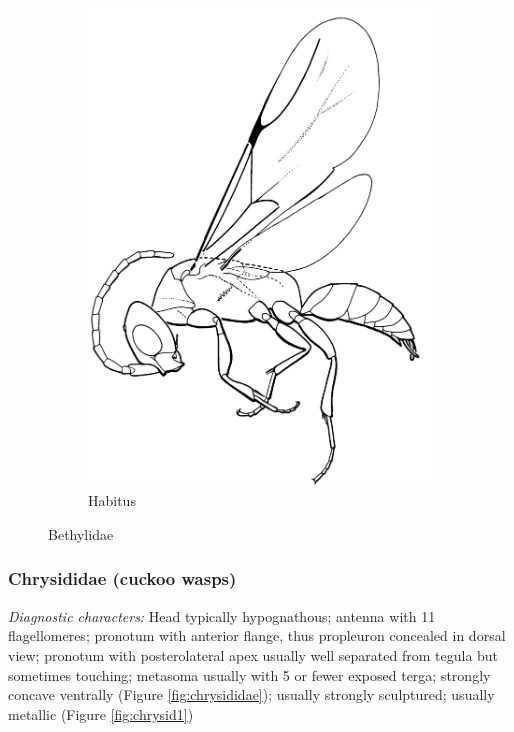 \documentclass[letterpaper, 11pt]{article}
\begin{document}
\begin{figure}[ht!]
\begin{subfigure}[ht!]{0.35\textwidth}
    \includegraphics[width=\textwidth]{BethylidHabitus}
  \caption{Habitus \citep[][Fig. 37]{goulet1993hymenoptera}}
  \label{fig:bethylid2}
\end{subfigure}
    \caption{Bethylidae}\label{fig:bethylids}
\end{figure}

\subsubsection{Chrysididae (cuckoo wasps)}
\noindent{}\textit{Diagnostic characters:} Head typically hypognathous; antenna with 11 flagellomeres; pronotum with anterior flange, thus propleuron concealed in dorsal view; pronotum with posterolateral apex usually well separated from tegula but sometimes touching; metasoma usually with 5 or fewer exposed terga; strongly concave ventrally (Figure \ref{fig:chrysididae}); usually strongly sculptured; usually metallic (Figure \ref{fig:chrysid1})\\
\end{document}
